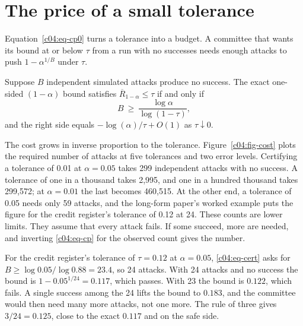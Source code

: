 \section{The price of a small tolerance}

Equation~\eqref{c04:eq-cp0} turns a tolerance into a budget. A committee that wants its
bound at or below $\tau$ from a run with no successes needs enough attacks to push
$1 - \alpha^{1/B}$ under $\tau$.

\begin{proposition}\label{c04:prop-cert}
Suppose $B$ independent simulated attacks produce no success. The exact one-sided
$(1-\alpha)$ bound satisfies $\overline{R}_{1-\alpha} \le \tau$ if and only if
\begin{equation}\label{c04:eq-cert}
B \ \ge\ \frac{\log\alpha}{\log(1-\tau)},
\end{equation}
and the right side equals $-\log(\alpha)/\tau + O(1)$ as $\tau \downarrow 0$.
\end{proposition}

The cost grows in inverse proportion to the tolerance. Figure~\ref{c04:fig-cost} plots
the required number of attacks at five tolerances and two error levels. Certifying a
tolerance of 0.01 at $\alpha = 0.05$ takes 299 independent attacks with no success. A
tolerance of one in a thousand takes 2,995, and one in a hundred thousand takes 299,572;
at $\alpha = 0.01$ the last becomes 460,515.
At the other end, a tolerance of 0.05 needs only 59 attacks, and the long-form paper's
worked example puts the figure for the credit register's tolerance of 0.12 at 24.
These counts are lower limits. They assume that every attack fails. If some succeed,
more are needed, and inverting \eqref{c04:eq-cp} for the observed count gives the number.

\begin{example}\label{c04:ex-24}
For the credit register's tolerance of $\tau = 0.12$ at $\alpha = 0.05$,
\eqref{c04:eq-cert} asks for $B \ge \log 0.05/\log 0.88 = 23.4$, so 24 attacks. With 24
attacks and no success the bound is $1 - 0.05^{1/24} = 0.117$, which passes. With 23 the
bound is $0.122$, which fails. A single success among the 24 lifts the bound to $0.183$,
and the committee would then need many more attacks, not one more. The rule of three
gives $3/24 = 0.125$, close to the exact $0.117$ and on the safe side.
\end{example}

